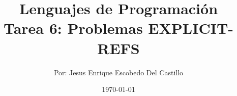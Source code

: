 \documentclass[10pt,oneside]{article}
\author{Por: Jesus Enrique Escobedo Del Castillo} %
\title{Lenguajes de Programación\\Tarea 6: Problemas EXPLICIT-REFS}
\date{\today}
\begin{document}
\maketitle
\thispagestyle{fancy} %

\nocite{Ross2012}
\printbibliography
\end{document}
